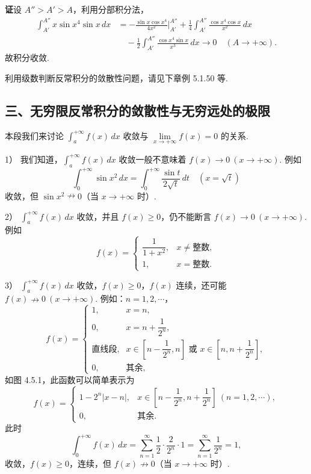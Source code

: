 \documentclass[UTF8, 12pt, fontset=fandol, oneside]{ctexart}
\begin{document}
\noindent\textbf{证}\quad 设 $A''>A'>A$，利用分部积分法，
\[
\begin{aligned}
\int_{A'}^{A''}x\sin x^4\sin x\,dx
&=-\frac{\sin x\cos x^4}{4x^2}\Big|_{A'}^{A''}
+\frac14\int_{A'}^{A''}\frac{\cos x^4\cos x}{x^2}\,dx\\
&\quad-\frac12\int_{A'}^{A''}\frac{\cos x^4\sin x}{x^3}\,dx
\longrightarrow0\quad(A\to+\infty).
\end{aligned}
\]
故积分收敛.

利用级数判断反常积分的敛散性问题，请见下章例 5.1.50 等.

\subsection*{三、无穷限反常积分的敛散性与无穷远处的极限}

本段我们来讨论 $\displaystyle\int_a^{+\infty}f(x)\,dx$ 收敛与 $\lim\limits_{x\to+\infty}f(x)=0$ 的关系.

1） 我们知道，$\displaystyle\int_a^{+\infty}f(x)\,dx$ 收敛一般不意味着 $f(x)\to0\ (x\to+\infty)$. 例如
\[
\int_0^{+\infty}\sin x^2\,dx
=\int_0^{+\infty}\frac{\sin t}{2\sqrt t}\,dt
\quad(x=\sqrt t)
\]
收敛，但 $\sin x^2\nrightarrow0$（当 $x\to+\infty$ 时）.

2） $\displaystyle\int_a^{+\infty}f(x)\,dx$ 收敛，并且 $f(x)\ge0$，仍不能断言 $f(x)\to0\ (x\to+\infty)$. 例如
\[
f(x)=
\begin{cases}
\dfrac1{1+x^2},&x\ne\text{整数},\\
1,&x=\text{整数}.
\end{cases}
\]

3） $\displaystyle\int_a^{+\infty}f(x)\,dx$ 收敛，$f(x)\ge0$，$f(x)$ 连续，还可能 $f(x)\nrightarrow0\ (x\to+\infty)$. 例如：$n=1,2,\cdots$，
\[
f(x)=
\begin{cases}
1,&x=n,\\
0,&x=n+\dfrac1{2^n},\\
\text{直线段},&x\in\left[n-\dfrac1{2^n},n\right]\text{ 或 }x\in\left[n,n+\dfrac1{2^n}\right],\\
0,&\text{其余},
\end{cases}
\]
如图 4.5.1，此函数可以简单表示为
\[
f(x)=
\begin{cases}
1-2^n|x-n|,&x\in\left[n-\dfrac1{2^n},n+\dfrac1{2^n}\right]\ (n=1,2,\cdots),\\
0,&\text{其余}.
\end{cases}
\]
此时
\[
\int_0^{+\infty}f(x)\,dx
=\sum_{n=1}^\infty\frac12\cdot\frac2{2^n}\cdot1
=\sum_{n=1}^\infty\frac1{2^n}=1,
\]
收敛，$f(x)\ge0$，连续，但 $f(x)\nrightarrow0$（当 $x\to+\infty$ 时）.
\end{document}

